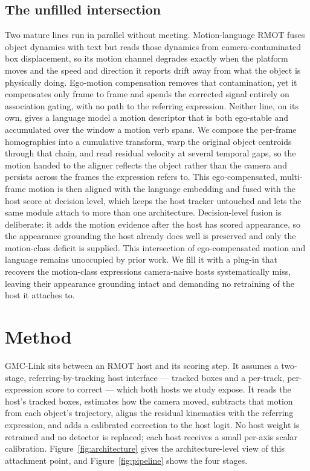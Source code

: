 \documentclass[sigconf,review,anonymous]{acmart}
\begin{document}
\subsection{The unfilled intersection}
Two mature lines run in parallel without meeting. Motion-language RMOT fuses object dynamics with text but reads those dynamics from camera-contaminated box displacement, so its motion channel degrades exactly when the platform moves and the speed and direction it reports drift away from what the object is physically doing. Ego-motion compensation removes that contamination, yet it compensates only frame to frame and spends the corrected signal entirely on association gating, with no path to the referring expression. Neither line, on its own, gives a language model a motion descriptor that is both ego-stable and accumulated over the window a motion verb spans. We compose the per-frame homographies into a cumulative transform, warp the original object centroids through that chain, and read residual velocity at several temporal gaps, so the motion handed to the aligner reflects the object rather than the camera and persists across the frames the expression refers to. This ego-compensated, multi-frame motion is then aligned with the language embedding and fused with the host score at decision level, which keeps the host tracker untouched and lets the same module attach to more than one architecture. Decision-level fusion is deliberate: it adds the motion evidence after the host has scored appearance, so the appearance grounding the host already does well is preserved and only the motion-class deficit is supplied. This intersection of ego-compensated motion and language remains unoccupied by prior work. We fill it with a plug-in that recovers the motion-class expressions camera-naive hosts systematically miss, leaving their appearance grounding intact and demanding no retraining of the host it attaches to.

\section{Method}
\label{sec:method}

GMC-Link sits between an RMOT host and its scoring step. It assumes a two-stage, referring-by-tracking host interface --- tracked boxes and a per-track, per-expression score to correct --- which both hosts we study expose. It reads the host's tracked boxes, estimates how the camera moved, subtracts that motion from each object's trajectory, aligns the residual kinematics with the referring expression, and adds a calibrated correction to the host logit. No host weight is retrained and no detector is replaced; each host receives a small per-axis scalar calibration. Figure~\ref{fig:architecture} gives the architecture-level view of this attachment point, and Figure~\ref{fig:pipeline} shows the four stages.
\end{document}
